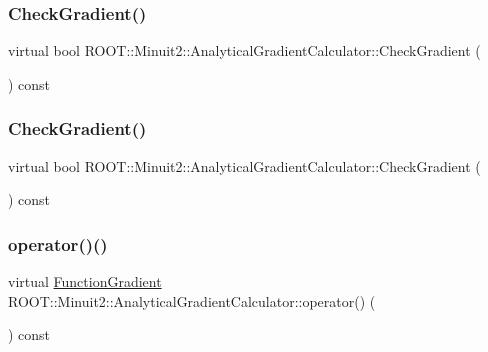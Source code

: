 \subsubsection{\texorpdfstring{CheckGradient()}{CheckGradient()}\hspace{0.1cm}{\footnotesize\ttfamily [2/3]}}
{\footnotesize\ttfamily virtual bool R\+O\+O\+T\+::\+Minuit2\+::\+Analytical\+Gradient\+Calculator\+::\+Check\+Gradient (\begin{DoxyParamCaption}{ }\end{DoxyParamCaption}) const\hspace{0.3cm}{\ttfamily [virtual]}}

\mbox{\label{classROOT_1_1Minuit2_1_1AnalyticalGradientCalculator_aad6bcafd96845df588392bb7b255ece8}} 
\subsubsection{\texorpdfstring{CheckGradient()}{CheckGradient()}\hspace{0.1cm}{\footnotesize\ttfamily [3/3]}}
{\footnotesize\ttfamily virtual bool R\+O\+O\+T\+::\+Minuit2\+::\+Analytical\+Gradient\+Calculator\+::\+Check\+Gradient (\begin{DoxyParamCaption}{ }\end{DoxyParamCaption}) const\hspace{0.3cm}{\ttfamily [virtual]}}

\mbox{\label{classROOT_1_1Minuit2_1_1AnalyticalGradientCalculator_a711ef74b01726ca7081031998c44d81b}} 
\subsubsection{\texorpdfstring{operator()()}{operator()()}\hspace{0.1cm}{\footnotesize\ttfamily [1/6]}}
{\footnotesize\ttfamily virtual \mbox{\hyperlink{classROOT_1_1Minuit2_1_1FunctionGradient}{Function\+Gradient}} R\+O\+O\+T\+::\+Minuit2\+::\+Analytical\+Gradient\+Calculator\+::operator() (\begin{DoxyParamCaption}\item[{const \mbox{\hyperlink{classROOT_1_1Minuit2_1_1MinimumParameters}{Minimum\+Parameters}} \&}]{ }\end{DoxyParamCaption}) const\hspace{0.3cm}{\ttfamily [virtual]}}



